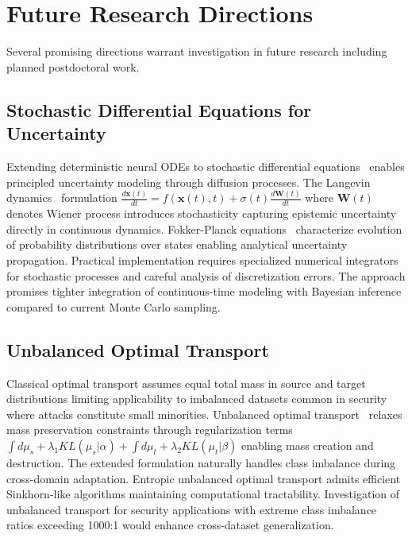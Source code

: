 \section*{Future Research Directions}

Several promising directions warrant investigation in future research including planned postdoctoral work.

\subsection*{Stochastic Differential Equations for Uncertainty}

Extending deterministic neural ODEs to stochastic differential equations~\cite{li2020scalable} enables principled uncertainty modeling through diffusion processes. The Langevin dynamics~\cite{welling2011bayesian} formulation $\frac{d\mathbf{x}(t)}{dt} = f(\mathbf{x}(t), t) + \sigma(t) \frac{d\mathbf{W}(t)}{dt}$ where $\mathbf{W}(t)$ denotes Wiener process introduces stochasticity capturing epistemic uncertainty directly in continuous dynamics. Fokker-Planck equations~\cite{risken1996fokker} characterize evolution of probability distributions over states enabling analytical uncertainty propagation. Practical implementation requires specialized numerical integrators for stochastic processes and careful analysis of discretization errors. The approach promises tighter integration of continuous-time modeling with Bayesian inference compared to current Monte Carlo sampling.

\subsection*{Unbalanced Optimal Transport}

Classical optimal transport assumes equal total mass in source and target distributions limiting applicability to imbalanced datasets common in security where attacks constitute small minorities. Unbalanced optimal transport~\cite{chizat2018unbalanced,sejourne2019sinkhorn} relaxes mass preservation constraints through regularization terms $\int d\mu_s + \lambda_1 KL(\mu_s|\alpha) + \int d\mu_t + \lambda_2 KL(\mu_t|\beta)$ enabling mass creation and destruction. The extended formulation naturally handles class imbalance during cross-domain adaptation. Entropic unbalanced optimal transport admits efficient Sinkhorn-like algorithms maintaining computational tractability. Investigation of unbalanced transport for security applications with extreme class imbalance ratios exceeding 1000:1 would enhance cross-dataset generalization.

